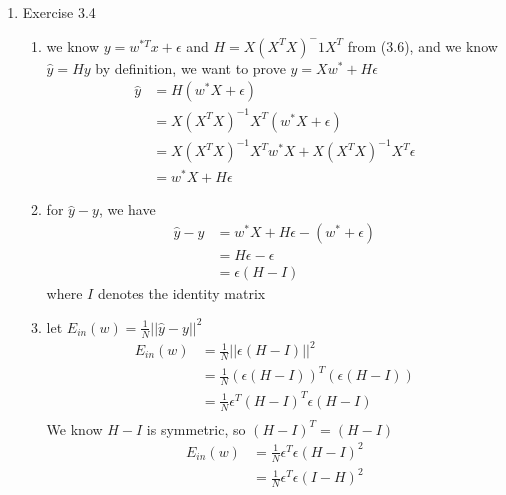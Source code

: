 \documentclass{article}
\begin{document}
    \begin{enumerate}
        \item Exercise 3.4
        \begin{enumerate}[label=(\alph*)]
            \item we know $y = w^{*T}x + \epsilon$ and $H = X(X^TX)^-1X^T$ from (3.6), and we know $\hat{y} = Hy$ by definition, we want to prove $\hat{y} = Xw^* + H\epsilon$
            \begin{align*}
                \hat{y} &= H(w^*X + \epsilon)\\
                &= X(X^TX)^{-1}X^T(w^*X+\epsilon)\\
                &= X(X^TX)^{-1}X^Tw^*X + X(X^TX)^{-1}X^T\epsilon\\
                &= w^*X + H\epsilon
            \end{align*}

            \item for $\hat{y} - y$, we have
            \begin{align*}
                \hat{y} - y &= w^*X + H\epsilon - (w^* + \epsilon)\\
                &= H\epsilon - \epsilon\\
                &= \epsilon(H - I)
            \end{align*}
            where $I$ denotes the identity matrix

            \item let $E_{in}(w) = \frac{1}{N} ||\hat{y} - y||^2$
            \begin{align*}
                E_{in}(w) &= \frac{1}{N}||\epsilon(H-I)||^2\\
                &= \frac{1}{N}(\epsilon(H - I))^T(\epsilon(H - I))\\
                &= \frac{1}{N}\epsilon^T(H-I)^T\epsilon(H-I)\\
            \end{align*}
            We know $H - I$ is symmetric, so $(H-I)^T = (H-I)$
            \begin{align*}
                E_{in}(w) &= \frac{1}{N}\epsilon^T\epsilon(H-I)^2\\
                &= \frac{1}{N}\epsilon^T\epsilon(I - H)^2
            \end{align*}


\end{enumerate}
\end{enumerate}
\end{document}
